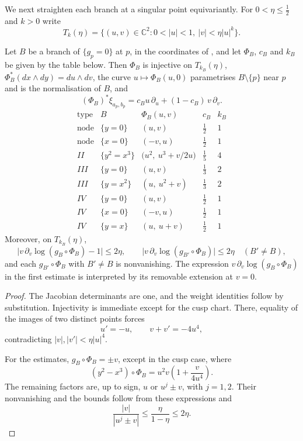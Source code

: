 \documentclass[a4paper]{amsart}
\newcommand{\C}{\mathbb{C}}
\numberwithin{equation}{section}
\begin{document}
We next straighten each branch at a singular point equivariantly. For
$0<\eta\le\frac12$ and $k>0$ write
\[
 T_k(\eta)=\{(u,v)\in\C^2:0<|u|<1,\ |v|<\eta|u|^k\}.
\]

\begin{lemma}\label{lem:branch-coordinates}
Let $B$ be a branch of $\{g_p=0\}$ at $p$, in the coordinates of
, and let $\Phi_B$, $c_B$ and $k_B$ be
given by the table below. Then $\Phi_B$ is injective on
$T_{k_B}(\eta)$, $\Phi_B^*(dx\wedge dy)=du\wedge dv$, the curve
$u\mapsto\Phi_B(u,0)$ parametrises $B\setminus\{p\}$ near $p$ and is the
normalisation of $B$, and
\[
 (\Phi_B)^*\xi_{a_p,b_p}=c_Bu\,\partial_u+(1-c_B)\,v\,\partial_v .
\]
\[
\begin{array}{c|c|c|c|c}
 \text{type}&B&\Phi_B(u,v)&c_B&k_B\\\hline
 \text{node}&\{y=0\}&(u,v)&\tfrac12&1\\
 \text{node}&\{x=0\}&(-v,u)&\tfrac12&1\\
 II&\{y^2=x^3\}&\bigl(u^2,\ u^3+v/2u\bigr)&\tfrac15&4\\
 III&\{y=0\}&(u,v)&\tfrac13&2\\
 III&\{y=x^2\}&(u,\ u^2+v)&\tfrac13&2\\
 IV&\{y=0\}&(u,v)&\tfrac12&1\\
 IV&\{x=0\}&(-v,u)&\tfrac12&1\\
 IV&\{y=x\}&(u,\ u+v)&\tfrac12&1
\end{array}
\]
Moreover, on $T_{k_B}(\eta)$,
\begin{equation}\label{eq:branch-factor-bounds}
 \bigl|v\,\partial_v\log(g_B\circ\Phi_B)-1\bigr|\le2\eta,
 \qquad
 \bigl|v\,\partial_v\log(g_{B'}\circ\Phi_B)\bigr|\le2\eta
 \quad(B'\ne B),
\end{equation}
and each $g_{B'}\circ\Phi_B$ with $B'\ne B$ is nonvanishing.
The expression $v\,\partial_v\log(g_B\circ\Phi_B)$ in the first
estimate is interpreted by its removable extension at $v=0$.
\end{lemma}

\begin{proof}
The Jacobian determinants are one, and the weight identities follow by
substitution. Injectivity is immediate except for the cusp chart. There,
equality of the images of two distinct points forces
\[
 u'=-u,\qquad v+v'=-4u^4,
\]
contradicting $|v|,|v'|<\eta|u|^4$.

For the estimates, $g_B\circ\Phi_B=\pm v$, except in the cusp case,
where
\[
 (y^2-x^3)\circ\Phi_B=u^2v\left(1+\frac{v}{4u^4}\right).
\]
The remaining factors are, up to sign, $u$ or $u^j\pm v$, with $j=1,2$.
Their nonvanishing and the bounds follow from these expressions and
\[
 \frac{|v|}{|u^j\pm v|}\le\frac{\eta}{1-\eta}\le2\eta.
\]
\end{proof}
\end{document}
